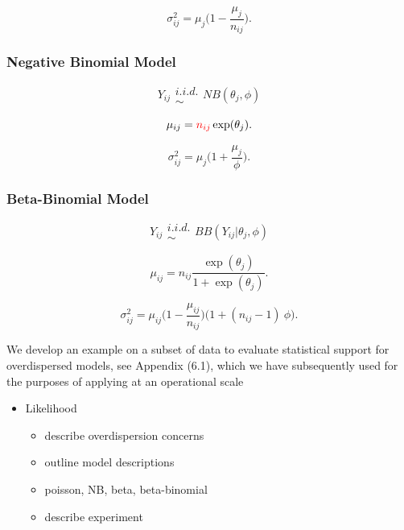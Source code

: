 \documentclass[12pt]{article}
\begin{document}
%
\begin{equation}
\sigma^2_{ij} = \mu_{j}\Big(1-\frac{\mu_{j}}{n_{ij}}\Big).
\end{equation}

%
\subsubsection{Negative Binomial Model}

%
\begin{equation}
Y_{ij} \substack{i.i.d.\\\sim} NB(\theta_{j}, \phi)
\end{equation}

%
\begin{equation}
\mu_{ij} = {\color{red}n_{ij}} \exp(\theta_{j}).
\end{equation}

%
\begin{equation}
\sigma^2_{ij} = \mu_{j}\Big(1+\frac{\mu_{j}}{\phi}\Big).
\end{equation}

%
\subsubsection{Beta-Binomial Model}

%
\begin{equation}
Y_{ij} \substack{i.i.d.\\\sim} BB(Y_{ij}|\theta_{j}, \phi)
\end{equation}

%
\begin{equation}
\mu_{ij} = n_{ij}\frac{\exp(\theta_{j})}{1+\exp(\theta_{j})}.
\end{equation}

%
\begin{equation}
\sigma^2_{ij} = \mu_{ij}\Big(1-\frac{\mu_{ij}}{n_{ij}}\Big)\Big(1+(n_{ij}-1)~\phi\Big).
\end{equation}


We develop an example on a subset of data to evaluate statistical support for 
overdispersed models, see Appendix (6.1), which we have subsequently used for the purposes of applying at an operational scale 

\begin{itemize}
\item Likelihood
	\begin{itemize}
	\item describe overdispersion concerns
	\item outline model descriptions
	\item poisson, NB, beta, beta-binomial
	\item describe experiment
	\end{itemize}
\end{itemize}
\end{document}
